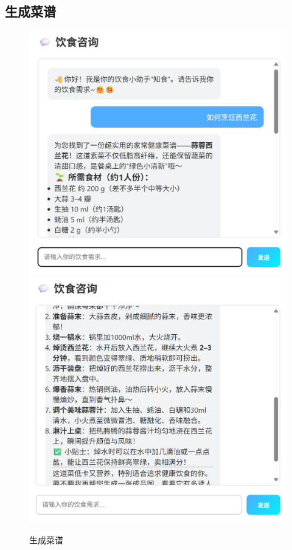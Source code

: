 \documentclass[a4paper,UTF8]{ctexart}
\begin{document}
\subsection{生成菜谱}
\begin{figure}[H]
    \centering
    \includegraphics[width=0.8\linewidth,height=0.45\textheight,keepaspectratio]{2-1.png}\\[1ex]
    \includegraphics[width=0.8\linewidth,height=0.45\textheight,keepaspectratio]{2-2.png}\\[1ex]
    \caption{生成菜谱}
    \label{fig:diet_recommend}
\end{figure}
\end{document}
